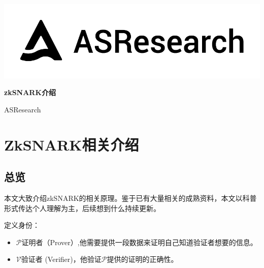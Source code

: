 \documentclass[12pt]{article}
\newcommand{\zk}{zkSNARK}
\newcommand{\pp}{$\mathcal{P}$}
\newcommand{\vv}{$\mathcal{V}$}
\begin{document}
\pagestyle{empty}
\renewcommand{\contentsname}{目录}
\renewcommand{\abstractname}{摘要}
\renewcommand{\refname}{参考文献}
\renewcommand{\figurename}{图}
\renewcommand{\tablename}{表}
\renewcommand{\baselinestretch}{1.5}
\renewcommand{\appendixname}{附录}
\renewcommand{\proofname}{证明}

\pagecolor{\pcolor}



\begin{titlepage}
  \begin{center}
    \vspace*{5.5cm}
    \includegraphics[scale=0.5]{../common/logo.png}
    \vspace{0.5cm}


   \textbf{\huge{\zk 介绍}}

    \vspace{0.5cm}
    ASResearch
    \textbf{}
  \end{center}

\end{titlepage}
\setcounter{page}{0}
\tableofcontents
\newpage
\setcounter{page}{1}
\pagestyle{fancy}
\vspace*{0.01cm}

\section{ZkSNARK相关介绍}
\subsection{总览}
本文大致介绍zkSNARK的相关原理。鉴于已有大量相关的成熟资料，本文以科普形式传达个人理解为主，后续想到什么持续更新。

定义身份：
\begin{itemize}
\item \pp 证明者（Prover）,他需要提供一段数据来证明自己知道验证者想要的信息。
\item \vv 验证者 (Verifier)，他验证\pp 提供的证明的正确性。
\end{itemize}
\end{document}
